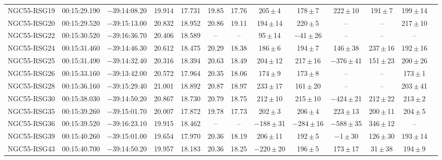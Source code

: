 \begin{table}
\begin{threeparttable}
\begin{tabular}{lcccccccccccl}
 \hline
NGC55-RSG19 & 00:15:29.190 & $-$39:14:08.20& 19.914 & 17.731 &19.85 & 17.76 &   205\,$\pm$\,4  &  178\,$\pm$\,7   &    222\,$\pm$\,10 &   191\,$\pm$\,7               & 199\,$\pm$\,14 & \\
NGC55-RSG20 & 00:15:29.520 & $-$39:15:13.00& 20.832 & 18.952 &20.86 & 19.11 &   194\,$\pm$\,14 &  220\,$\pm$\,5   & -- & --                                           & 217\,$\pm$\,10 & \\
NGC55-RSG22 & 00:15:30.520 & $-$39:16:36.70& 20.406 & 18.589 & --   & --    &    95\,$\pm$\,14 &$-$41\,$\pm$\,26  & -- & --                                           & --             & \\
NGC55-RSG24 & 00:15:31.460 & $-$39:14:46.30& 20.612 & 18.475 &20.29 & 18.38 &   186\,$\pm$\,6  &  194\,$\pm$\,7   &    146\,$\pm$\,38 &   237\,$\pm$\,16              & 192\,$\pm$\,16 & \\
NGC55-RSG25 & 00:15:31.490 & $-$39:14:32.40& 20.316 & 18.394 &20.63 & 18.49 &   204\,$\pm$\,12 &  217\,$\pm$\,16  & $-$376\,$\pm$\,41\tnote{c} & 151\,$\pm$\,23       & 200\,$\pm$\,26 & \\
NGC55-RSG26 & 00:15:33.160 & $-$39:13:42.00& 20.572 & 17.964 &20.35 & 18.06 &   174\,$\pm$\,9  &  173\,$\pm$\,8   & -- & --                                           & 173\,$\pm$\,1  & \\
NGC55-RSG28 & 00:15:36.160 & $-$39:15:29.40& 21.001 & 18.892 &20.87 & 18.97 &   233\,$\pm$\,17 &  161\,$\pm$\,20  & -- & --                                           & 203\,$\pm$\,41 & \\
NGC55-RSG30 & 00:15:38.030 & $-$39:14:50.20& 20.867 & 18.730 &20.79 & 18.75 &   212\,$\pm$\,10 &  215\,$\pm$\,10  & $-$424\,$\pm$\,21\tnote{c} & 212\,$\pm$\,22       & 213\,$\pm$\,2  & \\
NGC55-RSG35 & 00:15:39.260 & $-$39:15:01.70& 20.007 & 17.872 &19.78 & 17.73 &   202\,$\pm$\,3  &  206\,$\pm$\,4   &    223\,$\pm$\,13 &   200\,$\pm$\,11              & 204\,$\pm$\,5  & \\
NGC55-RSG36 & 00:15:39.520 & $-$39:16:23.10& 19.915 & 18.462 & --   & --    &$-$188\,$\pm$\,31 &$-$284\,$\pm$\,16 & $-$588\,$\pm$\,35 &   346\,$\pm$\,12              & --             & \\
NGC55-RSG39 & 00:15:40.260 & $-$39:15:01.00& 19.654 & 17.970 &20.36 & 18.19 &   206\,$\pm$\,11 &  192\,$\pm$\,5&$-$1\,$\pm$\,30\tnote{c}& 126\,$\pm$\,30              & 193\,$\pm$\,14 & \\
NGC55-RSG43 & 00:15:40.700 & $-$39:14:50.20& 19.957 & 18.183 &20.36 & 18.25 &$-$220\,$\pm$\,20\tnote{c}&196\,$\pm$\,5& 173\,$\pm$\,17 &    31\,$\pm$\,38\tnote{c}     & 194\,$\pm$\,9  & \\

\end{tabular}
\end{threeparttable}
\end{table}
